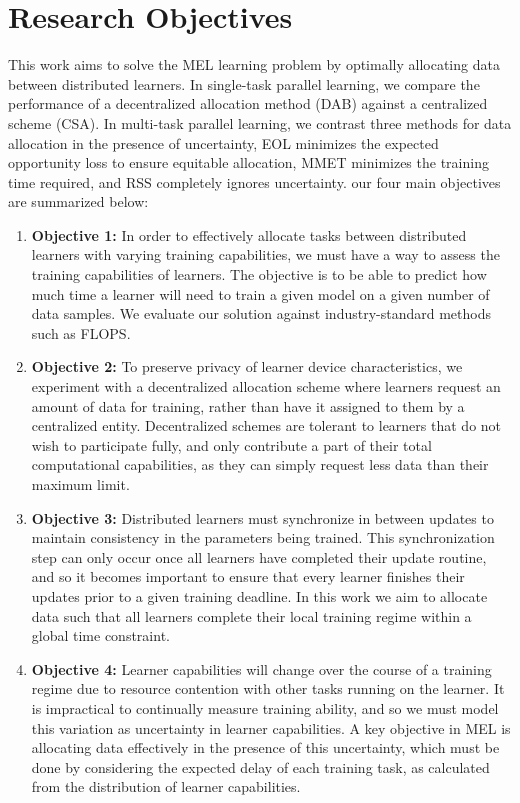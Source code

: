 \section{Research Objectives}

This work aims to solve the MEL learning problem by optimally allocating data between distributed learners. In single-task parallel learning, we compare the performance of a decentralized allocation method (DAB) against a centralized scheme (CSA). In multi-task parallel learning, we contrast three methods for data allocation in the presence of uncertainty, EOL minimizes the expected opportunity loss to ensure equitable allocation, MMET minimizes the training time required, and RSS completely ignores uncertainty. our four main objectives are summarized below:

\begin{enumerate}
  \item \textbf{Objective 1:} In order to effectively allocate tasks between distributed learners with varying training capabilities, we must have a way to assess the training capabilities of learners. The objective is to be able to predict how much time a learner will need to train a given model on a given number of data samples. We evaluate our solution against industry-standard methods such as FLOPS.

  \item \textbf{Objective 2:} To preserve privacy of learner device characteristics, we experiment with a decentralized allocation scheme where learners request an amount of data for training, rather than have it assigned to them by a centralized entity. Decentralized schemes are tolerant to learners that do not wish to participate fully, and only contribute a part of their total computational capabilities, as they can simply request less data than their maximum limit.

  \item \textbf{Objective 3:} Distributed learners must synchronize in between updates to maintain consistency in the parameters being trained. This synchronization step can only occur once all learners have completed their update routine, and so it becomes important to ensure that every learner finishes their updates prior to a given training deadline. In this work we aim to allocate data such that all learners complete their local training regime within a global time constraint.

  \item \textbf{Objective 4:} Learner capabilities will change over the course of a training regime due to resource contention with other tasks running on the learner. It is impractical to continually measure training ability, and so we must model this variation as uncertainty in learner capabilities. A key objective in MEL is allocating data effectively in the presence of this uncertainty, which must be done by considering the expected delay of each training task, as calculated from the distribution of learner capabilities.

\end{enumerate}

